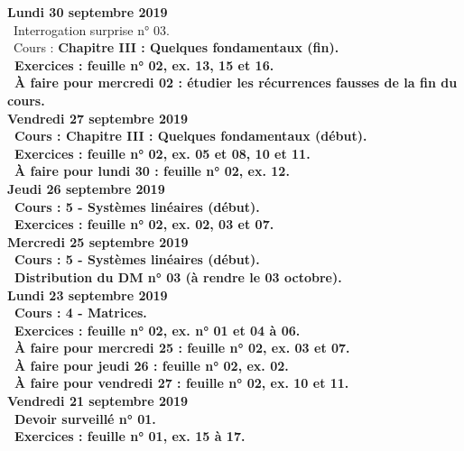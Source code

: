 \documentclass[12pt,a4paper]{article}
\begin{document}
\noindent\textbf{\bf Lundi 30 septembre 2019}\\
 \bu\ Interrogation surprise n° 03.\\
 \bu\ Cours : \bf Chapitre III \rm : Quelques fondamentaux (fin).\\
 \bu\ Exercices : feuille n° 02, ex. 13, 15 et 16.\\
\bu\ À faire pour mercredi 02 : étudier les récurrences fausses de la fin du cours.\vspace{.4cm}\\

 \noindent\textbf{Vendredi 27 septembre 2019}\\
 \bu\ Cours : \bf Chapitre III \rm : Quelques fondamentaux (début).\\
 \bu\ Exercices : feuille n° 02, ex. 05 et 08, 10 et 11.\\
 \bu\ À faire pour lundi 30 : feuille n° 02, ex. 12.\vspace{.4cm}\\
 
 \noindent\textbf{Jeudi 26 septembre 2019}\\
 \bu\ Cours : 5 - Systèmes linéaires (début).\\
 \bu\ Exercices : feuille n° 02, ex. 02, 03 et 07.\vspace{.4cm}\\
 
 \noindent\textbf{\bf Mercredi 25 septembre 2019}\\
 \bu\ Cours : 5 - Systèmes linéaires (début).\\
 \bu\ Distribution du DM n° 03 (à rendre le 03 octobre).\\
 
 \noindent\textbf{\bf Lundi 23 septembre 2019}\\
 \bu\ Cours : 4 - Matrices.\\
 \bu\ Exercices : feuille n° 02, ex. n° 01 et 04 à 06.\\
 \bu\ À faire pour mercredi 25 : feuille n° 02, ex. 03 et 07.\\
 \bu\ À faire pour jeudi 26 : feuille n° 02, ex. 02.\\
 \bu\ À faire pour vendredi 27 : feuille n° 02, ex. 10 et 11.\vspace{.4cm}\\ 
 
 \noindent\textbf{Vendredi 21 septembre 2019}\\
 \bu\ Devoir surveillé n° 01.\\
 \bu\ Exercices : feuille n° 01, ex. 15 à 17.\vspace{.4cm}\\
  
\end{document}
